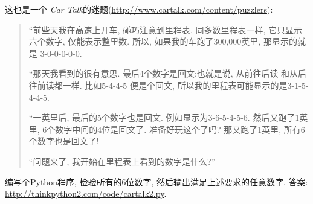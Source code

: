 \documentclass[10pt]{book}
\begin{document}
\begin{exercise}
这也是一个 {\em Car Talk}的迷题(\url{http://www.cartalk.com/content/puzzlers}):

\begin{quote}
%
%

``前些天我在高速上开车, 碰巧注意到里程表. 
同多数里程表一样, 它只显示六个数字, 仅能表示整里数. 
所以, 如果我的车跑了300,000英里, 那显示的就是
3-0-0-0-0-0.

``那天我看到的很有意思. 最后4个数字是回文;也就是说, 从前往后读
和从后往前读都一样. 比如5-4-4-5 便是个回文, 
所以我的里程表可能显示的是3-1-5-4-4-5.

``一英里后, 最后的5个数字也是回文. 
例如显示为3-6-5-4-5-6. 然后又跑了1英里, 6个数字中间的4位是回文了. 
准备好玩这个了吗?  那又跑了1英里, 所有6个数字也是回文了!

``问题来了, 我开始在里程表上看到的数字是什么?''
\end{quote}

编写个Python程序, 检验所有的6位数字, 然后输出满足上述要求的任意数字. 
答案: \url{http://thinkpython2.com/code/cartalk2.py}.

\end{exercise}
\end{document}
